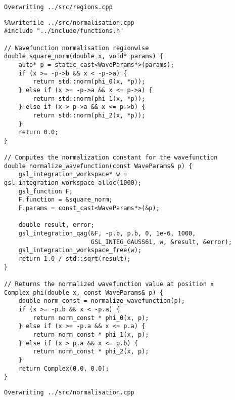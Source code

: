 \documentclass[11pt]{article}
\begin{document}
\label{org8504907}
\begin{verbatim}
Overwriting ../src/regions.cpp
\end{verbatim}

\begin{verbatim}
%%writefile ../src/normalisation.cpp
#include "../include/functions.h"

// Wavefunction normalisation regionwise
double square_norm(double x, void* params) {
    auto* p = static_cast<WaveParams*>(params);
    if (x >= -p->b && x < -p->a) {
        return std::norm(phi_0(x, *p));
    } else if (x >= -p->a && x <= p->a) {
        return std::norm(phi_1(x, *p));
    } else if (x > p->a && x <= p->b) {
        return std::norm(phi_2(x, *p));
    }
    return 0.0;
}

// Computes the normalization constant for the wavefunction
double normalize_wavefunction(const WaveParams& p) {
    gsl_integration_workspace* w = gsl_integration_workspace_alloc(1000);
    gsl_function F;
    F.function = &square_norm;
    F.params = const_cast<WaveParams*>(&p);

    double result, error;
    gsl_integration_qag(&F, -p.b, p.b, 0, 1e-6, 1000,
                        GSL_INTEG_GAUSS61, w, &result, &error);
    gsl_integration_workspace_free(w);
    return 1.0 / std::sqrt(result);
}

// Returns the normalized wavefunction value at position x
Complex phi(double x, const WaveParams& p) {
    double norm_const = normalize_wavefunction(p);
    if (x >= -p.b && x < -p.a) {
        return norm_const * phi_0(x, p);
    } else if (x >= -p.a && x <= p.a) {
        return norm_const * phi_1(x, p);
    } else if (x > p.a && x <= p.b) {
        return norm_const * phi_2(x, p);
    }
    return Complex(0.0, 0.0);
}
\end{verbatim}

\label{org713379d}
\begin{verbatim}
Overwriting ../src/normalisation.cpp
\end{verbatim}
\end{document}
